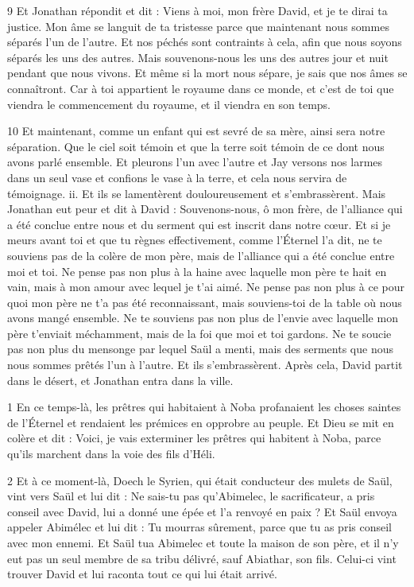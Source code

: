 \par 9 Et Jonathan répondit et dit : Viens à moi, mon frère David, et je te dirai ta justice. Mon âme se languit de ta tristesse parce que maintenant nous sommes séparés l'un de l'autre. Et nos péchés sont contraints à cela, afin que nous soyons séparés les uns des autres. Mais souvenons-nous les uns des autres jour et nuit pendant que nous vivons. Et même si la mort nous sépare, je sais que nos âmes se connaîtront. Car à toi appartient le royaume dans ce monde, et c'est de toi que viendra le commencement du royaume, et il viendra en son temps.

\par 10 Et maintenant, comme un enfant qui est sevré de sa mère, ainsi sera notre séparation. Que le ciel soit témoin et que la terre soit témoin de ce dont nous avons parlé ensemble. Et pleurons l'un avec l'autre et Jay versons nos larmes dans un seul vase et confions le vase à la terre, et cela nous servira de témoignage. ii. Et ils se lamentèrent douloureusement et s'embrassèrent. Mais Jonathan eut peur et dit à David : Souvenons-nous, ô mon frère, de l'alliance qui a été conclue entre nous et du serment qui est inscrit dans notre cœur. Et si je meurs avant toi et que tu règnes effectivement, comme l'Éternel l'a dit, ne te souviens pas de la colère de mon père, mais de l'alliance qui a été conclue entre moi et toi. Ne pense pas non plus à la haine avec laquelle mon père te hait en vain, mais à mon amour avec lequel je t'ai aimé. Ne pense pas non plus à ce pour quoi mon père ne t'a pas été reconnaissant, mais souviens-toi de la table où nous avons mangé ensemble. Ne te souviens pas non plus de l'envie avec laquelle mon père t'enviait méchamment, mais de la foi que moi et toi gardons. Ne te soucie pas non plus du mensonge par lequel Saül a menti, mais des serments que nous nous sommes prêtés l'un à l'autre. Et ils s'embrassèrent. Après cela, David partit dans le désert, et Jonathan entra dans la ville.


\par 1 En ce temps-là, les prêtres qui habitaient à Noba profanaient les choses saintes de l'Éternel et rendaient les prémices en opprobre au peuple. Et Dieu se mit en colère et dit : Voici, je vais exterminer les prêtres qui habitent à Noba, parce qu'ils marchent dans la voie des fils d'Héli.

\par 2 Et à ce moment-là, Doech le Syrien, qui était conducteur des mulets de Saül, vint vers Saül et lui dit : Ne sais-tu pas qu'Abimelec, le sacrificateur, a pris conseil avec David, lui a donné une épée et l'a renvoyé en paix ? Et Saül envoya appeler Abimélec et lui dit : Tu mourras sûrement, parce que tu as pris conseil avec mon ennemi. Et Saül tua Abimelec et toute la maison de son père, et il n'y eut pas un seul membre de sa tribu délivré, sauf Abiathar, son fils. Celui-ci vint trouver David et lui raconta tout ce qui lui était arrivé.

